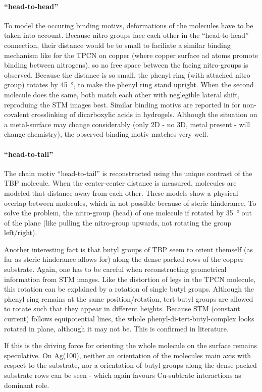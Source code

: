 \paragraph{``head-to-head''}
To model the occuring binding motivs, deformations of the molecules have to be taken into account. Because nitro groups face each other in the ``head-to-head'' connection, their distance would be to small to faciliate a similar binding mechanism like for the TPCN on copper (where copper surface ad atoms promote binding between nitrogens), so no free space between the facing nitro-groups is observed. Because the distance is so small, the phenyl ring (with attached nitro group) rotates by \SI{45}{\degree}, to make the phenyl ring stand upright. When the second molecule does the same, both match each other with neglegible lateral shift, reproduing the STM images best. Similar binding motivs are reported in \cite{kato_dispersive_2008} for non-covalent crosslinking of dicarboxylic acids in hydrogels. Although the situation on a metal-surface may change considerably (only 2D - no 3D, metal present - will change chemistry), the observed binding motiv matches very well.

\paragraph{``head-to-tail''}
The chain motiv ``head-to-tail'' is reconstructed using the unique contrast of the TBP molecule. When the center-center distance is measured, molecules are modeled that distance away from each other. These models show a physical overlap between molecules, which in not possible because of steric hinderance. To solve the problem, the nitro-group (head) of one molecule if rotated by \SI{35}{\degree} out of the plane (like pulling the nitro-group upwards, not rotating the group left/right). 


Another interesting fact is that butyl groups of TBP seem to orient themself (as far as steric hinderance allows for) along the dense packed rows of the copper substrate. Again, one has to be careful when reconstructing geometrical information from STM images. Like the distortion of legs in the TPCN molecule, this rotation can be explained by a rotation of single butyl groups. Although the phenyl ring remains at the same position/rotation, tert-butyl groups are allowed to rotate such that they appear in different heights. Because STM (constant current) follows equipotential lines, the whole phenyl-di-tert-butyl-complex looks rotated in plane, although it may not be. This is confirmed in literature\cite{heim_surface-assisted_2010,heim_self-assembly_2010}.

If this is the driving force for orienting the whole molecule on the surface remains speculative. On Ag(100), neither an orientation of the molecules main axis with respect to the substrate, nor a orientation of butyl-groups along the dense packed substrate rows can be seen - which again favours Cu-subtrate interactions as dominant role.